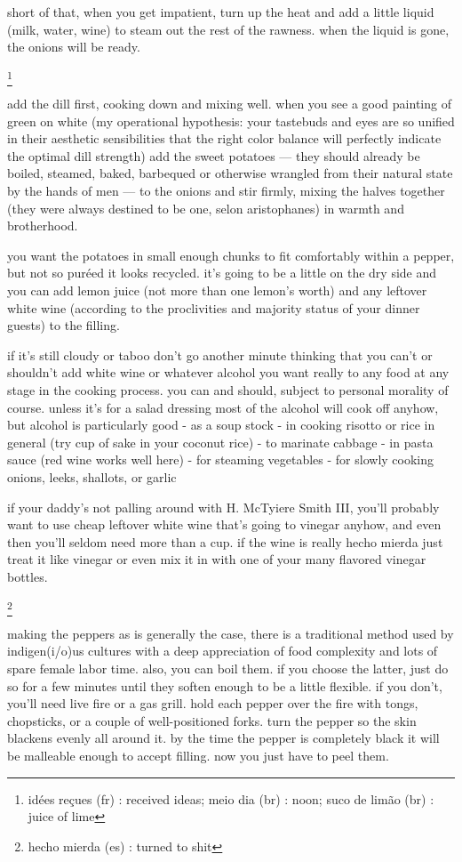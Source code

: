 short of that, when you get impatient, turn up the heat and add a little liquid (milk, water, wine) to steam out the rest of the rawness. when the liquid is gone, the onions will be ready.

\footnote{id\'{e}es re\c{c}ues (fr) : received ideas;   meio dia (br) : noon;
suco de lim\~{a}o (br) : juice of lime}

add the dill first, cooking down and mixing well. when you see a good painting of green on white (my operational hypothesis: your tastebuds and eyes are so unified in their aesthetic sensibilities that the right color balance will perfectly indicate the optimal dill strength) add the sweet potatoes --- they should already be boiled, steamed, baked, barbequed or otherwise wrangled from their natural state by the hands of men --- to the onions and stir firmly, mixing the halves together (they were always destined to be one, selon aristophanes) in warmth and brotherhood.

you want the potatoes in small enough chunks to fit comfortably within a pepper, but not so pur\'{e}ed it looks recycled. it's going to be a little on the dry side and you can add lemon juice (not more than one lemon's worth) and any leftover white wine (according to the proclivities and majority status of your dinner guests) to the filling.

if it's still cloudy or taboo don't go another minute thinking that you can't or shouldn't add white wine or whatever alcohol you want really to any food at any stage in the cooking process. you can and should, subject to personal morality of course.
	unless it's for a salad dressing most of the alcohol will cook off anyhow, but alcohol is particularly good
- as a soup stock 
- in cooking risotto or rice in general (try \onehalf cup of sake in your coconut rice)
- to marinate cabbage
- in pasta sauce (red wine works well here)
- for steaming vegetables
- for slowly cooking onions, leeks, shallots, or garlic

	if your daddy's not palling around with H. McTyiere Smith III, you'll probably want to use cheap leftover white wine that's going to vinegar anyhow, and even then you'll seldom need more than a cup. if the wine is really hecho mierda just treat it like vinegar or even mix it in with one of your many flavored vinegar bottles.

\footnote{hecho mierda (es) : turned to shit}


	making the peppers
as is generally the case, there is a traditional method used by indigen(i/o)us cultures with a deep appreciation of food complexity and lots of spare female labor time. also, you can boil them. if you choose the latter, just do so for a 
few minutes until they soften enough to be a little flexible. if you don't, you'll need live fire or a gas grill.
	hold each pepper over the fire with tongs, chopsticks, or a couple of well-positioned forks. turn the pepper so the skin blackens evenly all around it. by the time the pepper is completely black it will be malleable enough to accept filling. now you just have to peel them.

